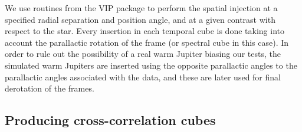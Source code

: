 \documentclass{aa}
\begin{document}
We use routines from the \textsc{VIP} package to perform the spatial injection at a specified radial separation and position angle, and at a given contrast with respect to the star.
Every insertion in each temporal cube is done taking into account the parallactic rotation of the frame (or spectral cube in this case).
In order to rule out the possibility of a real warm Jupiter biasing our tests, the simulated warm Jupiters are inserted using the opposite parallactic angles to the parallactic angles associated with the data, and these are later used for final derotation of the frames.


\subsection{Producing cross-correlation cubes}\label{sec:specpreproc}

\end{document}
